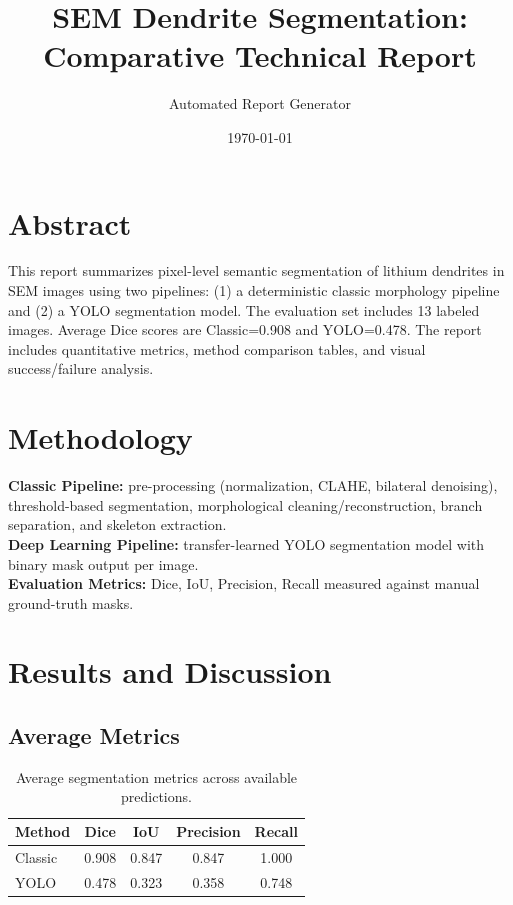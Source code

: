 \documentclass[11pt,a4paper]{article}
\title{SEM Dendrite Segmentation: Comparative Technical Report}
\author{Automated Report Generator}
\date{\today}
\begin{document}
\maketitle

\section*{Abstract}
This report summarizes pixel-level semantic segmentation of lithium dendrites in SEM images using two pipelines:
(1) a deterministic classic morphology pipeline and
(2) a YOLO segmentation model.
The evaluation set includes 13 labeled images.
Average Dice scores are Classic=0.908 and YOLO=0.478.
The report includes quantitative metrics, method comparison tables, and visual success/failure analysis.

\section*{Methodology}
\textbf{Classic Pipeline:} pre-processing (normalization, CLAHE, bilateral denoising), threshold-based segmentation,
morphological cleaning/reconstruction, branch separation, and skeleton extraction.\\
\textbf{Deep Learning Pipeline:} transfer-learned YOLO segmentation model with binary mask output per image.\\
\textbf{Evaluation Metrics:} Dice, IoU, Precision, Recall measured against manual ground-truth masks.

\section*{Results and Discussion}
\subsection*{Average Metrics}
\begin{table}[H]
\centering
\begin{tabular}{lcccc}
\toprule
Method & Dice & IoU & Precision & Recall \\
\midrule
Classic & 0.908 & 0.847 & 0.847 & 1.000 \\
YOLO & 0.478 & 0.323 & 0.358 & 0.748 \\
\bottomrule
\end{tabular}
\caption{Average segmentation metrics across available predictions.}
\end{table}
\end{document}
